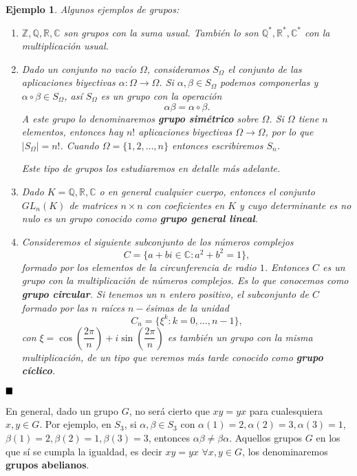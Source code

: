 \documentclass[12pt]{article}
\newtheorem{example}{Ejemplo}[theorem]
\begin{document}
\begin{example} Algunos ejemplos de grupos:
\begin{enumerate}
\item $\mathbb{Z}, \mathbb{Q}, \mathbb{R}, \mathbb{C}$ son grupos con la suma usual. También lo son $\mathbb{Q}^*, \mathbb{R}^*, \mathbb{C}^*$ con la multiplicación usual.
\item Dado un conjunto no vacío $\Omega$, consideramos $S_{\Omega}$ el conjunto de las aplicaciones biyectivas $\alpha \colon \Omega \longrightarrow \Omega$. Si $\alpha, \beta \in S_{\Omega}$ podemos componerlas y $\alpha \circ \beta \in S_{\Omega}$, así $S_{\Omega}$ es un grupo con la operación $$\alpha \beta = \alpha \circ \beta.$$ A este grupo lo denominaremos \textbf{grupo simétrico} sobre $\Omega$. Si $\Omega$ tiene $n$ elementos, entonces hay $n!$ aplicaciones biyectivas $\Omega \longrightarrow \Omega$, por lo que $|S_{\Omega}| = n!$. Cuando $\Omega = \lbrace 1, 2, \ldots, n \rbrace$ entonces escribiremos $S_{n}$.

Este tipo de grupos los estudiaremos en detalle más adelante. 

\item Dado $K = \mathbb{Q}, \mathbb{R}, \mathbb{C}$ o en general cualquier cuerpo, entonces el conjunto $GL_{n}(K)$ de matrices $n\times n$ con coeficientes en $K$ y cuyo determinante es no nulo es un grupo conocido como \textbf{grupo general lineal}.
\item Consideremos el siguiente subconjunto de los números complejos $$C = \lbrace a+bi \in \mathbb{C}: a^2+b^2 = 1 \rbrace,$$ formado por los elementos de la circunferencia de radio $1$. Entonces $C$ es un grupo con la multiplicación de números complejos. Es lo que conocemos como \textbf{grupo circular}. Si tenemos un $n$ entero positivo, el subconjunto de $C$ formado por las $n$ raíces $n-$ésimas de la unidad $$C_{n}= \lbrace \xi^k : k =0, \ldots, n-1 \rbrace,$$ con $\xi = \cos\left( \dfrac{2\pi}{n} \right) + i\sin\left(\dfrac{2\pi}{n}\right)$ es también un grupo con la misma multiplicación, de un tipo que veremos más tarde conocido como \textbf{grupo cíclico}.
\end{enumerate}
\end{example}
$\hfill \blacksquare$


En general, dado un grupo $G$, no será cierto que $xy = yx$ para cualesquiera $x,y \in G$. Por ejemplo, en $S_{3}$, si $\alpha, \beta \in S_{3}$ con $\alpha(1) = 2, \alpha (2)=3, \alpha (3) = 1$, $\beta (1)=2, \beta(2)=1, \beta (3) = 3$, entonces $\alpha \beta \neq \beta \alpha$. Aquellos grupos $G$ en los que sí se cumpla la igualdad, es decir $xy = yx$ $\forall x,y \in G$, los denominaremos \textbf{grupos abelianos}.
\end{document}
